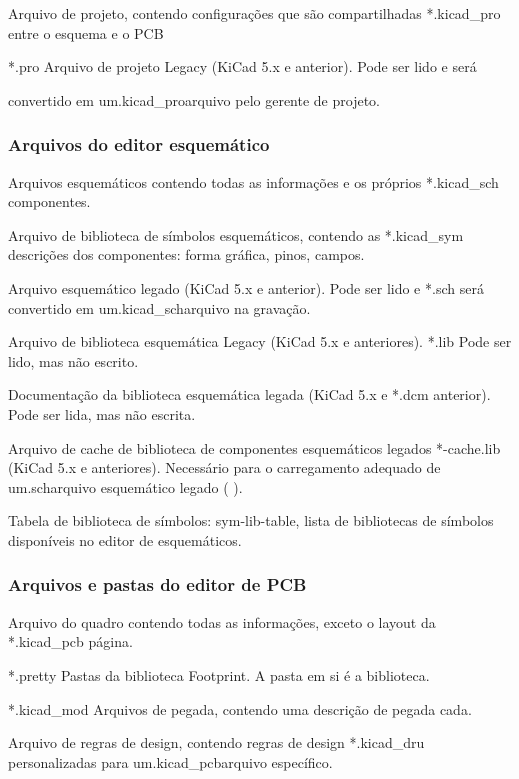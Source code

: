 Arquivo de projeto, contendo configurações que são compartilhadas *.kicad\_pro entre o esquema e o PCB

*.pro Arquivo de projeto Legacy (KiCad 5.x e anterior). Pode ser lido e será

convertido em um.kicad\_proarquivo pelo gerente de projeto.

\hypertarget{arquivos-do-editor-esquemuxe1tico}{%
\subsubsection{Arquivos do editor esquemático}\label{arquivos-do-editor-esquemuxe1tico}}

Arquivos esquemáticos contendo todas as informações e os próprios *.kicad\_sch componentes.

Arquivo de biblioteca de símbolos esquemáticos, contendo as *.kicad\_sym descrições dos componentes: forma gráfica, pinos, campos.

Arquivo esquemático legado (KiCad 5.x e anterior). Pode ser lido e *.sch será convertido em um.kicad\_scharquivo na gravação.

Arquivo de biblioteca esquemática Legacy (KiCad 5.x e anteriores). *.lib Pode ser lido, mas não escrito.

Documentação da biblioteca esquemática legada (KiCad 5.x e *.dcm anterior). Pode ser lida, mas não escrita.

Arquivo de cache de biblioteca de componentes esquemáticos legados *-cache.lib (KiCad 5.x e anteriores). Necessário para o carregamento adequado de um.scharquivo esquemático legado ( ).

Tabela de biblioteca de símbolos: sym-lib-table, lista de bibliotecas de símbolos disponíveis no editor de esquemáticos.

\hypertarget{arquivos-e-pastas-do-editor-de-pcb}{%
\subsubsection{Arquivos e pastas do editor de PCB}\label{arquivos-e-pastas-do-editor-de-pcb}}

Arquivo do quadro contendo todas as informações, exceto o layout da *.kicad\_pcb página.

*.pretty Pastas da biblioteca Footprint. A pasta em si é a biblioteca.

*.kicad\_mod Arquivos de pegada, contendo uma descrição de pegada cada.

Arquivo de regras de design, contendo regras de design *.kicad\_dru personalizadas para um.kicad\_pcbarquivo específico.

